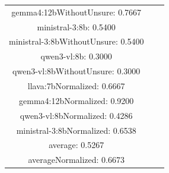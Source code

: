 \documentclass[a4paper]{article}
\begin{document}
\begin{tabular}{ccc}
gemma4:12bWithoutUnsure: 0.7667 \\ ministral-3:8b: 0.5400 \\ ministral-3:8bWithoutUnsure: 0.5400 \\ qwen3-vl:8b: 0.3000 \\ qwen3-vl:8bWithoutUnsure: 0.3000 \\ llava:7bNormalized: 0.6667 \\ gemma4:12bNormalized: 0.9200 \\ qwen3-vl:8bNormalized: 0.4286 \\ ministral-3:8bNormalized: 0.6538 \\ average: 0.5267 \\ averageNormalized: 0.6673 \end{minipage}\\
\end{tabular}

\vspace{5mm}
\end{document}
